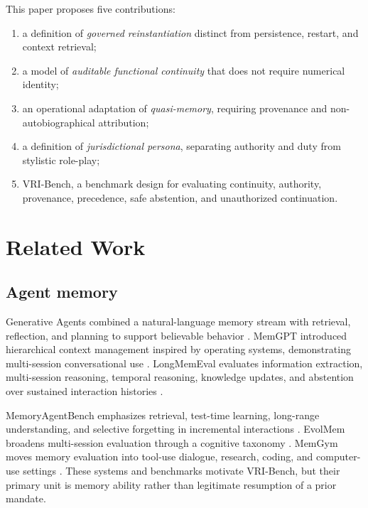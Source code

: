 \documentclass[10pt]{article}
\newcommand{\vribench}{VRI-Bench}
\begin{document}
This paper proposes five contributions:

\begin{enumerate}[leftmargin=*]
  \item a definition of \emph{governed reinstantiation} distinct from persistence, restart, and context retrieval;
  \item a model of \emph{auditable functional continuity} that does not require numerical identity;
  \item an operational adaptation of \emph{quasi-memory}, requiring provenance and non-autobiographical attribution;
  \item a definition of \emph{jurisdictional persona}, separating authority and duty from stylistic role-play;
  \item \vribench{}, a benchmark design for evaluating continuity, authority, provenance, precedence, safe abstention, and unauthorized continuation.
\end{enumerate}

\section{Related Work}

\subsection{Agent memory}

Generative Agents combined a natural-language memory stream with retrieval, reflection, and planning to support believable behavior \citep{park2023generative}. MemGPT introduced hierarchical context management inspired by operating systems, demonstrating multi-session conversational use \citep{packer2023memgpt}. LongMemEval evaluates information extraction, multi-session reasoning, temporal reasoning, knowledge updates, and abstention over sustained interaction histories \citep{wu2024longmemeval}.

MemoryAgentBench emphasizes retrieval, test-time learning, long-range understanding, and selective forgetting in incremental interactions \citep{hu2025memoryagentbench}. EvolMem broadens multi-session evaluation through a cognitive taxonomy \citep{shen2026evolmem}. MemGym moves memory evaluation into tool-use dialogue, research, coding, and computer-use settings \citep{xu2026memgym}. These systems and benchmarks motivate VRI-Bench, but their primary unit is memory ability rather than legitimate resumption of a prior mandate.
\end{document}
